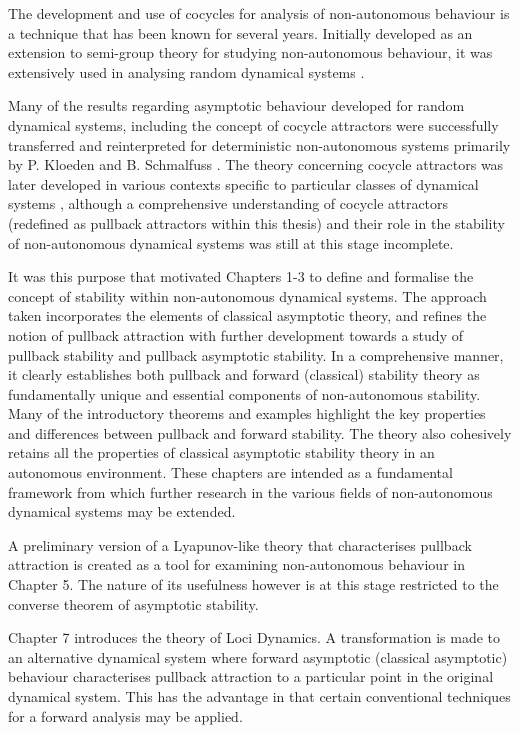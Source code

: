 \setcounter{page}{1}
\pagestyle{plain}

The development and use of cocycles for analysis of
non-autonomous behaviour is a technique that has been known for several
years. Initially developed as an extension to semi-group theory for
studying non-autonomous behaviour, it was extensively used in analysing
random dynamical systems \cite{Ar98,CrFlDe97,CrFl94,FlSc96}.

Many of the results regarding asymptotic behaviour developed for random
dynamical systems, including the concept of cocycle attractors were
successfully transferred and reinterpreted for deterministic non-autonomous
systems primarily by P. Kloeden and B. Schmalfuss
\cite{KlSc95,KlSc96,Sc92,Sc99}. The theory concerning cocycle attractors was
later developed in various contexts specific to particular classes of dynamical
systems \cite{ChKlSc98,ChKlSc00,FS95}, although a comprehensive understanding
of cocycle attractors (redefined as pullback attractors within this thesis) and
their role in the stability of non-autonomous dynamical systems was still at
this stage incomplete.

It was this purpose that motivated Chapters 1-3 to define and formalise the
concept of stability within non-autonomous dynamical systems.  The approach
taken incorporates the elements of classical asymptotic theory, and
refines the notion of pullback attraction with further development
towards a study of pullback stability and pullback asymptotic stability.
In a comprehensive manner, it clearly establishes both pullback and forward
(classical) stability theory as fundamentally unique and essential components of
non-autonomous stability. Many of the introductory theorems and examples
highlight the key properties and differences between pullback and forward
stability. The theory also cohesively retains all the properties of
classical asymptotic stability theory in an autonomous environment. These
chapters are intended as a fundamental framework from which further research in
the various fields of non-autonomous dynamical systems may be extended.

A preliminary version of a Lyapunov-like theory that characterises pullback
attraction is created as a tool for examining non-autonomous behaviour in
Chapter 5. The nature of its usefulness however is at this stage restricted
to the converse theorem of asymptotic stability.

Chapter 7 introduces the theory of Loci Dynamics. A transformation
is made to an alternative dynamical system where forward
asymptotic (classical asymptotic) behaviour characterises pullback
attraction to a particular point in the original dynamical system.
This has the advantage in that certain conventional techniques for
a forward analysis may be applied.

